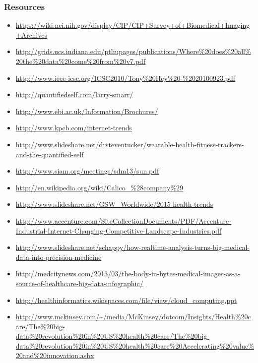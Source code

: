 
  


\subsubsection{Resources}\label{resources}

\begin{itemize}
\item
  \url{https://wiki.nci.nih.gov/display/CIP/CIP+Survey+of+Biomedical+Imaging+Archives}
\item
  \url{http://grids.ucs.indiana.edu/ptliupages/publications/Where\%20does\%20all\%20the\%20data\%20come\%20from\%20v7.pdf}
\item
  \url{http://www.ieee-icsc.org/ICSC2010/Tony\%20Hey\%20-\%2020100923.pdf}
\item
  \url{http://quantifiedself.com/larry-smarr/}
\item
  \url{http://www.ebi.ac.uk/Information/Brochures/}
\item
  \url{http://www.kpcb.com/internet-trends}
\item
  \url{http://www.slideshare.net/drsteventucker/wearable-health-fitness-trackers-and-the-quantified-self}
\item
  \url{http://www.siam.org/meetings/sdm13/sun.pdf}
\item
  \url{http://en.wikipedia.org/wiki/Calico_\%28company\%29}
\item
  \url{http://www.slideshare.net/GSW_Worldwide/2015-health-trends}
\item
  \url{http://www.accenture.com/SiteCollectionDocuments/PDF/Accenture-Industrial-Internet-Changing-Competitive-Landscape-Industries.pdf}
\item
  \url{http://www.slideshare.net/schappy/how-realtime-analysis-turns-big-medical-data-into-precision-medicine}
\item
  \url{http://medcitynews.com/2013/03/the-body-in-bytes-medical-images-as-a-source-of-healthcare-big-data-infographic/}
\item
  \url{http://healthinformatics.wikispaces.com/file/view/cloud_computing.ppt}
\item
  \url{http://www.mckinsey.com/~/media/McKinsey/dotcom/Insights/Health\%20care/The\%20big-data\%20revolution\%20in\%20US\%20health\%20care/The\%20big-data\%20revolution\%20in\%20US\%20health\%20care\%20Accelerating\%20value\%20and\%20innovation.ashx}

\end{itemize}
